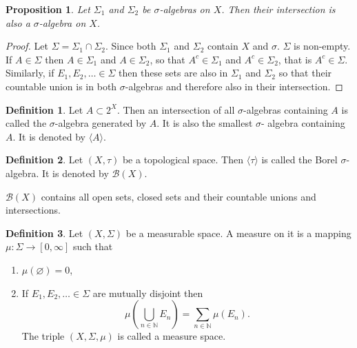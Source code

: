 \documentclass{article}
\theoremstyle{plain}
\numberwithin{thm}{section}
\theoremstyle{plain}
\newtheorem{prop}{Proposition}
\numberwithin{prop}{section}
\theoremstyle{definition}
\newtheorem{defn}{Definition}
\numberwithin{defn}{section}
\theoremstyle{remark}
\theoremstyle{plain}
\numberwithin{cor}{section}
\numberwithin{equation}{section}
\begin{document}
\begin{prop}\label{s1p3}
Let $\Sigma_1$ and $\Sigma_2$ be $\sigma$-algebras on $X$. Then their
intersection is also a $\sigma$-algebra on $X$.
\end{prop}
\begin{proof}
Let $\Sigma = \Sigma_1 \cap \Sigma_2$. Since both $\Sigma_1$ and 
$\Sigma_2$ contain $X$ and $\sigma$. $\Sigma$ is non-empty. If $A \in
\Sigma$ then $A \in \Sigma_1$ and $A \in \Sigma_2$, so that $A^c 
\in \Sigma_1$ and $A^c \in \Sigma_2$, that is $A^c \in \Sigma$. 
Similarly, if $E_1, E_2, \ldots \in \Sigma$ then these sets are also in 
$\Sigma_1$ and $\Sigma_2$ so that their countable union is in both
$\sigma$-algebras and therefore also in their intersection.
\end{proof}

\begin{defn}\label{s1d4}
Let $A \subset 2^X$. Then an intersection of all $\sigma$-algebras containing $A$
is called the $\sigma$-algebra generated by $A$. It is also the smallest $\sigma$-
algebra containing $A$. It is denoted by $\langle A \rangle$.
\end{defn}

\begin{defn}\label{s1d5}
Let $(X, \tau)$ be a topological space. Then $\langle\tau\rangle$ is called the
Borel $\sigma$-algebra. It is denoted by $\mathcal{B}(X)$.
\end{defn}

$\mathcal{B}(X)$ contains all open sets, closed sets and their countable unions
and intersections.

\begin{defn}\label{s1d6}
Let $(X, \Sigma)$ be a measurable space. A measure on it is a mapping
$\mu: \Sigma \rightarrow [0, \infty]$ such that
\begin{enumerate}
\item $\mu(\varnothing) = 0$,
\item If $E_1, E_2, \ldots \in \Sigma$ are mutually disjoint then
\[
\mu\left(\bigcup_{n \in \mathbb{N}}E_n\right) = \sum_{n \in \mathbb{N}}\mu(E_n).
\]
The triple $(X, \Sigma, \mu)$ is called a measure space.
\end{enumerate}
\end{defn}
\end{document}
